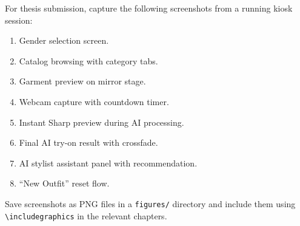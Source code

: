 For thesis submission, capture the following screenshots from a running kiosk session:

\begin{enumerate}[leftmargin=*]
  \item Gender selection screen.
  \item Catalog browsing with category tabs.
  \item Garment preview on mirror stage.
  \item Webcam capture with countdown timer.
  \item Instant Sharp preview during AI processing.
  \item Final AI try-on result with crossfade.
  \item AI stylist assistant panel with recommendation.
  \item ``New Outfit'' reset flow.
\end{enumerate}

Save screenshots as PNG files in a \texttt{figures/} directory and include them using \texttt{\textbackslash includegraphics} in the relevant chapters.
